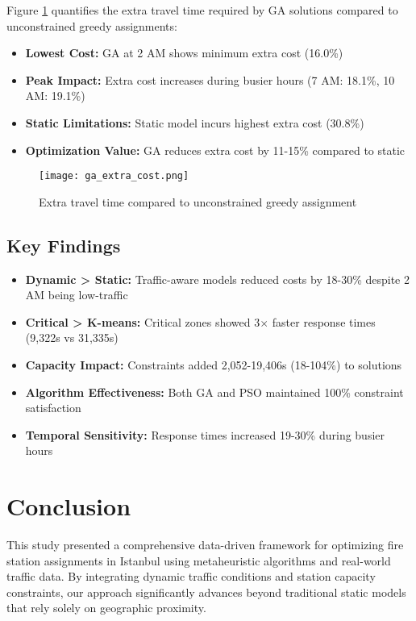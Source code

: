 \documentclass[conference]{IEEEtran}
\begin{document}
Figure \ref{fig:ga_extra_cost} quantifies the extra travel time required by GA solutions compared to unconstrained greedy assignments:
\begin{itemize}
    \item \textbf{Lowest Cost:} GA at 2 AM shows minimum extra cost (16.0\%) 
    \item \textbf{Peak Impact:} Extra cost increases during busier hours (7 AM: 18.1\%, 10 AM: 19.1\%)
    \item \textbf{Static Limitations:} Static model incurs highest extra cost (30.8\%) 
    \item \textbf{Optimization Value:} GA reduces extra cost by 11-15\% compared to static
\end{itemize}

\begin{figure}[htbp]
    \centering
    \texttt{[image: ga\_extra\_cost.png]}
    \caption{Extra travel time compared to unconstrained greedy assignment}
    \label{fig:ga_extra_cost}
\end{figure}

\subsection*{Key Findings}
\begin{itemize}
    \item \textbf{Dynamic > Static:} Traffic-aware models reduced costs by 18-30\% despite 2 AM being low-traffic
    \item \textbf{Critical > K-means:} Critical zones showed 3$\times$ faster response times (9,322s vs 31,335s)
    \item \textbf{Capacity Impact:} Constraints added 2,052-19,406s (18-104\%) to solutions
    \item \textbf{Algorithm Effectiveness:} Both GA and PSO maintained 100\% constraint satisfaction
    \item \textbf{Temporal Sensitivity:} Response times increased 19-30\% during busier hours
\end{itemize}

\section*{\textbf{Conclusion}}
This study presented a comprehensive data-driven framework for optimizing fire station assignments in Istanbul using metaheuristic algorithms and real-world traffic data. By integrating dynamic traffic conditions and station capacity constraints, our approach significantly advances beyond traditional static models that rely solely on geographic proximity. 
\end{document}

